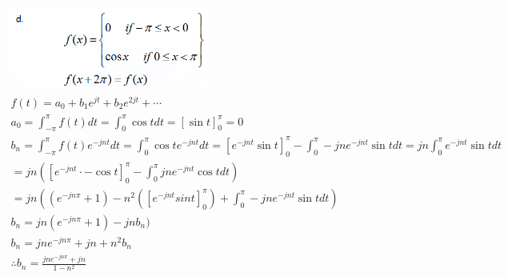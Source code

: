 \documentclass[12pt,a4paper]{article}
\begin{document}
\includegraphics[width=0.5\textwidth]{4.png}
\begin{gather*}
f(t)=a_0 + b_1 e^{jt} + b_2 e^{2jt} + \cdots\\
a_0 = \int_{-\pi}^{\pi} f(t) dt
=\int_0^\pi \cos t dt = \left[\sin t\right]_0^\pi = 0\\
b_n = \int_{-\pi}^{\pi}f(t)e^{-jnt}dt
=\int_0^\pi \cos t e^{-jnt}dt
=\left[e^{-jnt}\sin t\right]_0^\pi -\int_0^\pi -jne^{-jnt}\sin t dt
=jn\int_0^\pi e^{-jnt}\sin t dt\\
=jn(\left[e^{-jnt}\cdot -\cos t\right]_0^\pi - \int_0^\pi jne^{-jnt}\cos t dt)\\
=jn((e^{-jn\pi} + 1) -n^2(\left[e^{-jnt}sint\right]_0^\pi)+\int_0^\pi -jne^{-jnt}\sin t dt)\\
b_n = jn(e^{-jn\pi} +1) -jnb_n)\\
b_n = jne^{-jn\pi} +jn + n^2b_n\\
\therefore b_n = \frac{jne^{-jn\pi}+jn}{1-n^2}
\end{gather*}
\end{document}

